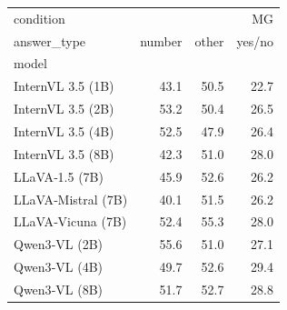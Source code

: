 \begin{tabular}{lrrr}
\toprule
condition & \multicolumn{3}{r}{MG} \\
answer_type & number & other & yes/no \\
model &  &  &  \\
\midrule
InternVL 3.5 (1B) & 43.1 & 50.5 & 22.7 \\
InternVL 3.5 (2B) & 53.2 & 50.4 & 26.5 \\
InternVL 3.5 (4B) & 52.5 & 47.9 & 26.4 \\
InternVL 3.5 (8B) & 42.3 & 51.0 & 28.0 \\
LLaVA‑1.5 (7B) & 45.9 & 52.6 & 26.2 \\
LLaVA‑Mistral (7B) & 40.1 & 51.5 & 26.2 \\
LLaVA‑Vicuna (7B) & 52.4 & 55.3 & 28.0 \\
Qwen3‑VL (2B) & 55.6 & 51.0 & 27.1 \\
Qwen3‑VL (4B) & 49.7 & 52.6 & 29.4 \\
Qwen3‑VL (8B) & 51.7 & 52.7 & 28.8 \\
\bottomrule
\end{tabular}
